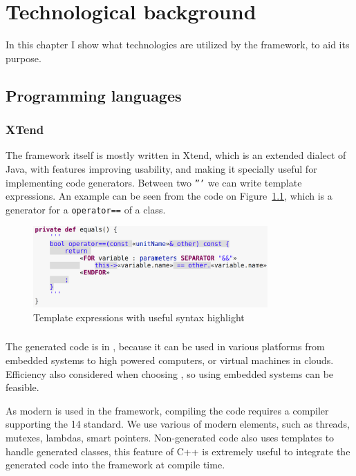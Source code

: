 \chapter{Technological background}

In this chapter I show what technologies are utilized by the framework, to aid its purpose.

\section{Programming languages}


\subsection{XTend}
The framework itself is mostly written in Xtend, which is an extended dialect of Java, with features improving usability, and making it specially useful for implementing code generators. 
Between two \texttt{'''} we can write template expressions.
An example can be seen from the code on Figure~\ref{fig:xtend}, which is a generator for a \cpp{} \texttt{operator==} of a class. 

\begin{figure}[H]
	\begin{center}
		\includegraphics[width=0.8\textwidth]{figures/xtend.png}
		\caption{Template expressions with useful syntax highlight }
		\label{fig:xtend}
	\end{center}
\end{figure}


\subsection{\protect\cpp }
The generated code is in \cpp{}, because it can be used in various platforms from embedded systems to high powered computers, or virtual machines in clouds. 
Efficiency also considered when choosing \cpp{}, so using embedded systems can be feasible. 

As modern \cpp{} is used in the framework, compiling the code requires a compiler supporting the \cpp{}14 standard.
We use various of modern \cpp{} elements, such as threads, mutexes, lambdas, smart pointers.
Non-generated code also uses templates to handle generated classes, this feature of C++ is extremely useful to integrate the generated code into the framework at compile time.

